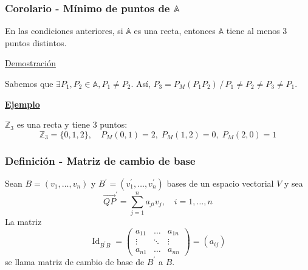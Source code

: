\documentclass[12pt, a4paper, ones, notitlepage, openany,titlepage]{article}
\newcommand{\demostracion}{\noindent\underline{Demostración}}
\newcommand{\ejemplo}{\noindent\underline{\textbf{Ejemplo}}}
\begin{document}
\subsubsection{Corolario - Mínimo de puntos de $\mathbb{A}$}
En las condiciones anteriores, si $\mathbb{A}$ es una recta, entonces $\mathbb{A}$ tiene al menos $3$ puntos distintos.

\demostracion

\noindent Sabemos que $\exists P_1, P_2 \in \mathbb{A}, P_1 \neq P_2$. Así, $P_3 = P_M(P_1 P_2) \,/\, P_1 \neq P_2 \neq P_3 \neq P_1$.

\ejemplo

\noindent $\mathbb{Z}_3$ es una recta y tiene $3$ puntos:
$$
\mathbb{Z}_3 = \{0,1,2\}, \quad P_M(0,1) = 2, \; P_M(1,2) = 0, \; P_M(2,0) = 1
$$

\subsubsection{Definición - Matriz de cambio de base}
\noindent Sean $B=\left(v_{1}, \ldots, v_{n}\right)$ y $B^{\prime}=\left(v_{1}^{\prime}, \ldots, v_{n}^{\prime}\right)$ bases de un espacio vectorial $V$ y sea
$$
\overrightarrow{QP}^{\prime}=\sum_{j=1}^{n} a_{j i} v_{j}, \quad i=1, \ldots, n
$$
La matriz
$$
\operatorname{Id}_{B^{\prime} B}=\left(\begin{array}{rrr}
	a_{11} & \ldots & a_{1 n} \\
	\vdots & \ddots & \vdots \\
	a_{n 1} & \ldots & a_{n n}
\end{array}\right)=\left(a_{i j}\right)
$$
se llama matriz de cambio de base de $B^{\prime}$ a $B$.
\end{document}
